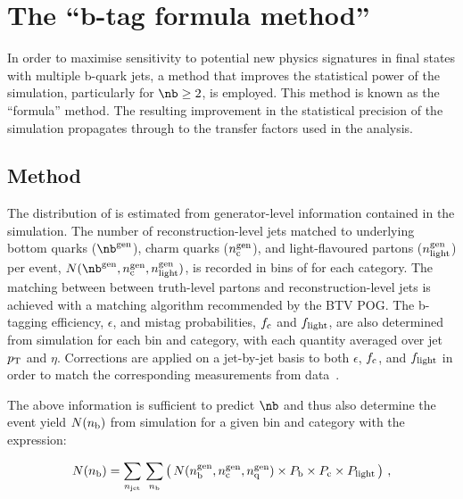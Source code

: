 \section{The ``b-tag formula method''\label{sec:bjets}}

In order to maximise sensitivity to potential new physics signatures
in final states with multiple b-quark jets, a method that improves the
statistical power of the simulation, particularly for $\nb \geq 2$, is
employed. This method is known as the ``formula'' method. The
resulting improvement in the statistical precision of the simulation
propagates through to the transfer factors used in the analysis.

\subsection{Method}

The distribution of \nb is estimated from generator-level information
contained in the simulation. The number of reconstruction-level jets
matched to underlying bottom quarks ($\nb^{\rm gen}$), charm quarks
($n_{\rm c}^{\rm gen}$), and light-flavoured partons ($n_{\rm
  light}^{\rm gen}$) per event, $N(\nb^{\rm gen},n_{\rm c}^{\rm
  gen},n_{\rm light}^{\rm gen})$, is recorded in bins of \scalht for
each \njet category.  The matching between between truth-level partons
and reconstruction-level jets is achieved with a matching algorithm
recommended by the BTV POG.%
The b-tagging efficiency, $\epsilon$, and mistag probabilities,
$f_{\rm c}$ and $f_{\rm light}$, are also determined from simulation
for each \scalht bin and \njet category, with each quantity averaged
over jet $p_{\rm T}$ and $\eta$. Corrections are applied on a
jet-by-jet basis to both $\epsilon$, $f_{\rm c}$, and $f_{\rm light}$
in order to match the corresponding measurements from
data~\cite{Chatrchyan:2012jua}.

The above information is sufficient to predict $\nb$ and thus also
determine the event yield $N(n_{\rm b})$ from simulation for a given
\scalht bin and \njet category with the expression:

\begin{equation}
  \label{equ:btag-formula}
  N(n_{\textrm{b}}) = \sum_{n_{\textrm{jet}}} \, \sum_{n_{\textrm{b}}}
  \left( \, N(n_{\textrm{b}}^{\textrm{gen}},
    n_{\textrm{c}}^{\textrm{gen}}, n_{\textrm{q}}^{\textrm{gen}})
    \times P_{\rm b} \times P_{\rm c} \times P_{\rm light} \, \right) \, , 
\end{equation}

